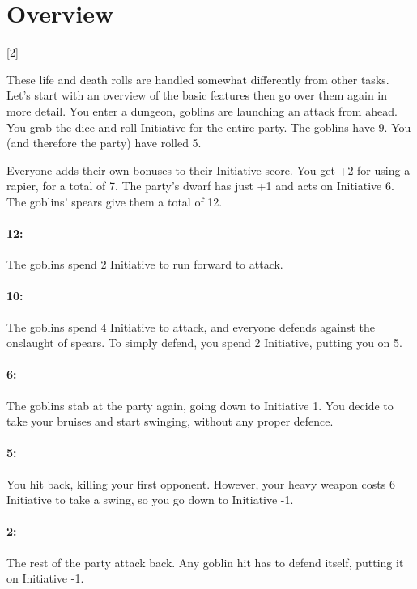 \section{Overview}

\begin{multicols}{2}

\startcontents[Combat]

[2]{}

These life and death rolls are handled somewhat differently from other tasks. Let's start with an overview of the basic features then go over them again in more detail. 
You enter a dungeon, goblins are launching an attack from ahead.
You grab the dice and roll Initiative for the entire party.
The goblins have 9.
You (and therefore the party) have rolled 5.

Everyone adds their own bonuses to their Initiative score.
You get +2 for using a rapier, for a total of 7.
The party's dwarf has just +1 and acts on Initiative 6.
The goblins' spears give them a total of 12.

\paragraph{12:} The goblins spend 2 Initiative to run forward to attack.

\paragraph{10:} The goblins spend 4 Initiative to attack, and everyone defends against the onslaught of spears.
To simply defend, you spend 2 Initiative, putting you on 5.
\paragraph{6:} The goblins stab at the party again, going down to Initiative 1.
You decide to take your bruises and start swinging, without any proper defence.
\paragraph{5:} You hit back, killing your first opponent.
However, your heavy weapon costs 6 Initiative to take a swing, so you go down to Initiative -1.
\paragraph{2:} The rest of the party attack back.
Any goblin hit has to defend itself, putting it on Initiative -1.

\end{multicols}
